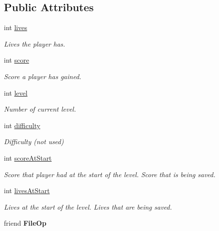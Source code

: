 \subsection*{Public Attributes}
\begin{DoxyCompactItemize}
\item 
\mbox{\label{class_player_ab3300fa23175647f3ff50311dd2a7e04}} 
int \hyperlink{class_player_ab3300fa23175647f3ff50311dd2a7e04}{lives}
\begin{DoxyCompactList}\small\item\em Lives the player has. \end{DoxyCompactList}\item 
\mbox{\label{class_player_ace6abae8d66534ad0a1fd6458f786a6e}} 
int \hyperlink{class_player_ace6abae8d66534ad0a1fd6458f786a6e}{score}
\begin{DoxyCompactList}\small\item\em Score a player has gained. \end{DoxyCompactList}\item 
\mbox{\label{class_player_aa1e06c89dea6981223879e6bfccdb5cd}} 
int \hyperlink{class_player_aa1e06c89dea6981223879e6bfccdb5cd}{level}
\begin{DoxyCompactList}\small\item\em Number of current level. \end{DoxyCompactList}\item 
\mbox{\label{class_player_ab6e8ff0cf99d796e9159983e9b7294ef}} 
int \hyperlink{class_player_ab6e8ff0cf99d796e9159983e9b7294ef}{difficulty}
\begin{DoxyCompactList}\small\item\em Difficulty (not used) \end{DoxyCompactList}\item 
\mbox{\label{class_player_a9ec05b48bbf5f21047492baa5987cf00}} 
int \hyperlink{class_player_a9ec05b48bbf5f21047492baa5987cf00}{score\+At\+Start}
\begin{DoxyCompactList}\small\item\em Score that player had at the start of the level. Score that is being saved. \end{DoxyCompactList}\item 
\mbox{\label{class_player_a54017815d04a18442d298ee20f09c7f1}} 
int \hyperlink{class_player_a54017815d04a18442d298ee20f09c7f1}{lives\+At\+Start}
\begin{DoxyCompactList}\small\item\em Lives at the start of the level. Lives that are being saved. \end{DoxyCompactList}\item 
\mbox{\label{class_player_a1f561778c9d4c2c0a990521bb2083219}} 
friend {\bfseries File\+Op}
\end{DoxyCompactItemize}


